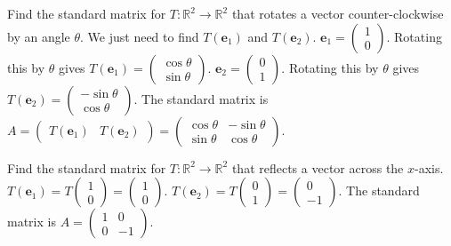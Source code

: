 \documentclass[oneside]{book}
\begin{document}
\begin{example}[Rotation]
Find the standard matrix for $T: \mathbb{R}^2 \to \mathbb{R}^2$ that rotates a vector counter-clockwise by an angle $\theta$.
We just need to find $T(\mathbf{e}_1)$ and $T(\mathbf{e}_2)$.
$\mathbf{e}_1 = \begin{pmatrix} 1 \\ 0 \end{pmatrix}$. Rotating this by $\theta$ gives $T(\mathbf{e}_1) = \begin{pmatrix} \cos\theta \\ \sin\theta \end{pmatrix}$.
$\mathbf{e}_2 = \begin{pmatrix} 0 \\ 1 \end{pmatrix}$. Rotating this by $\theta$ gives $T(\mathbf{e}_2) = \begin{pmatrix} -\sin\theta \\ \cos\theta \end{pmatrix}$.
The standard matrix is $A = \begin{pmatrix} T(\mathbf{e}_1) & T(\mathbf{e}_2) \end{pmatrix} = \begin{pmatrix} \cos\theta & -\sin\theta \\ \sin\theta & \cos\theta \end{pmatrix}$.
\end{example}

\begin{example}[Reflection]
Find the standard matrix for $T: \mathbb{R}^2 \to \mathbb{R}^2$ that reflects a vector across the $x$-axis.
$T(\mathbf{e}_1) = T\begin{pmatrix} 1 \\ 0 \end{pmatrix} = \begin{pmatrix} 1 \\ 0 \end{pmatrix}$.
$T(\mathbf{e}_2) = T\begin{pmatrix} 0 \\ 1 \end{pmatrix} = \begin{pmatrix} 0 \\ -1 \end{pmatrix}$.
The standard matrix is $A = \begin{pmatrix} 1 & 0 \\ 0 & -1 \end{pmatrix}$.
\end{example}
\end{document}

